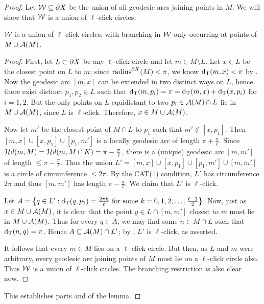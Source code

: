 \documentclass{amsart}
\renewcommand{\setp}[2]{\left\{#1 : #2\right\}}
\begin{document}
\begin{proof}
Let $\mathcal W \subseteq \partial X$ be the union of all geodesic arcs joining points in $M$.
We will show that $\mathcal W$ is a union of $\ell$-click circles.

\begin{claim}		\label{W is an lclick union}
$\mathcal W$ is a union of $\ell$-click circles, with branching in $\mathcal W$ only occurring at points of $M \cup \operatorname{\mathcal A}(M)$. \end{claim}

\begin{proof}
First, let $L \subset \partial X$ be any $\ell$-click circle and let $m \in M \setminus L$.  Let $x \in L$ be the closest point on $L$ to $m$; since $\operatorname{radius}^{\partial X} (M) < \pi$, we know $\operatorname{d_T}(m,x) < \pi$ by .  Now the geodesic arc $[m,x]$ can be extended in two distinct ways on $L$, hence there exist distinct $p_1, p_2 \in L$ such that $\operatorname{d_T} (m, p_i) = \pi = \operatorname{d_T}(m,x) + \operatorname{d_T}(x,p_i)$ for $i=1,2$.  But the only points on $L$ equidistant to two $p_i \in \operatorname{\mathcal A}(M) \cap L$ lie in $M \cup \operatorname{\mathcal A}(M)$, since $L$ is $\ell$-click.  Therefore, $x \in M \cup \operatorname{\mathcal A}(M)$.

Now let $m'$ be the closest point of $M \cap L$ to $p_1$ such that $m' \notin [x,p_1]$.  Then $[m,x] \cup [x,p_1] \cup [p_1,m']$ is a locally geodesic arc of length $\pi + \frac{\pi}{\ell}$.  Since $\mathcal{H}d(m, M) = \mathcal{H}d(m, M \cap K) = \pi - \frac{\pi}{\ell}$, there is a (unique) geodesic arc $[m,m']$ of length $\le \pi - \frac{\pi}{\ell}$.  Thus the union $L' = [m,x] \cup [x,p_1] \cup [p_1,m'] \cup [m,m']$ is a circle of circumference $\le 2\pi$.  By the CAT($1$) condition, $L'$ has circumference $2\pi$ and thus $[m,m']$ has length $\pi - \frac{\pi}{\ell}$.  We claim that $L'$ is $\ell$-click.

Let $A = \setp{q \in L'}{\dT(q,p_1) = \frac{2\pi k}{\ell} \text{ for some } k = 0,1,2,\dotsc,\frac{\ell-1}{2}}$.
Now, just as $x \in M \cup \operatorname{\mathcal A}(M)$, it is clear that the point $y \in L \cap [m,m']$ closest to $m$ must lie in $M \cup \operatorname{\mathcal A}(M)$.
Thus for every $q \in A$, we may find some $n \in M \cap L$ such that $\operatorname{d_T}(n,q) = \pi$.
Hence $A \subseteq \operatorname{\mathcal A}(M) \cap L'$; by , $L'$ is $\ell$-click, as asserted.

It follows that every $m \in M$ lies on a $\ell$-click circle.  But then, as $L$ and $m$ were arbitrary, every geodesic arc joining points of $M$ must lie on a $\ell$-click circle also.  Thus $\mathcal W$ is a union of $\ell$-click circles.
The branching restriction is also clear now.
\end{proof}

This establishes parts  and  of the lemma.


\end{proof}
\end{document}
